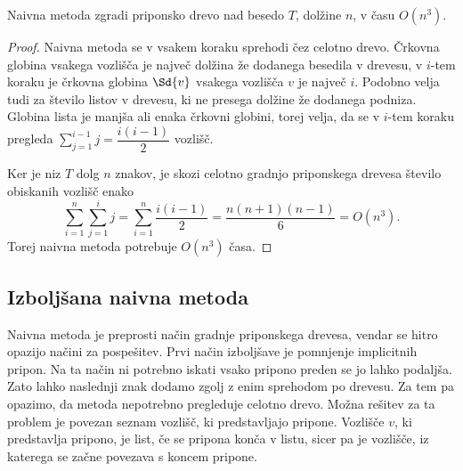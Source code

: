 \begin{izr}\label{izr:naivna}
    Naivna metoda zgradi priponsko drevo nad besedo $T$, dolžine $n$, v času $O(n^3)$.
\end{izr}

\begin{proof}
    Naivna metoda se v vsakem koraku sprehodi čez celotno drevo. Črkovna globina vsakega vozlišča je največ dolžina že dodanega besedila v drevesu, v $i$-tem koraku je črkovna globina $\Sd{v}$ vsakega vozlišča $v$ je največ $i$. Podobno velja tudi za število listov v drevesu, ki ne presega dolžine že dodanega podniza. Globina lista je manjša ali enaka črkovni globini, torej velja, da se v $i$-tem koraku pregleda $\sum_{j=1}^{i-1} j=\dfrac{i(i-1)}{2}$ vozlišč.

    Ker je niz $T$ dolg $n$ znakov, je skozi celotno gradnjo priponskega drevesa število obiskanih vozlišč enako
    $$
        \sum_{i=1}^n \sum_{j=1}^i j=\sum_{i=1}^n \dfrac{i(i-1)}{2}=\dfrac{n(n+1)(n-1)}{6}=O(n^3).
    $$
    Torej naivna metoda potrebuje $O(n^3)$ časa.
\end{proof}

\subsection{Izboljšana naivna metoda}
Naivna metoda je preprosti način gradnje priponskega drevesa, vendar se hitro opazijo načini za pospešitev. Prvi način izboljšave je pomnjenje implicitnih pripon. Na ta način ni potrebno iskati vsako pripono preden se jo lahko podaljša. Zato lahko naslednji znak dodamo zgolj z enim sprehodom po drevesu. Za tem pa opazimo, da metoda nepotrebno pregleduje celotno drevo. Možna rešitev za ta problem je povezan seznam vozlišč, ki predstavljajo pripone. Vozlišče $v$, ki predstavlja pripono, je list, če se pripona konča v listu, sicer pa je vozlišče, iz katerega se začne povezava s koncem pripone. 



